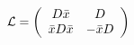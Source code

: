 \begin{equation}
{\cal{L}}= \left(
\begin{array}{cc}
D\bar{x} & D \\
\bar{x} D \bar{x} & -\bar{x} D
\end{array}
\right)
\end{equation}

